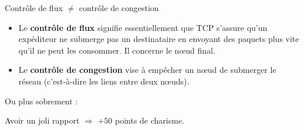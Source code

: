 \begin{callout}{Contrôle de flux $\neq$ contrôle de congestion}
    \begin{itemize}
        \item Le \textbf{contrôle de flux} signifie essentiellement que TCP s'assure qu'un expéditeur ne submerge pas un destinataire en envoyant des paquets plus vite qu'il ne peut les consommer. Il concerne le nœud final.
        \item Le \textbf{contrôle de congestion} vise à empêcher un nœud de submerger le réseau (c'est-à-dire les liens entre deux nœuds).
    \end{itemize}
\end{callout}

Ou plus sobrement :

\begin{myboxedtext}
    Avoir un joli rapport $\Rightarrow$ $+50$ points de charisme.
\end{myboxedtext}